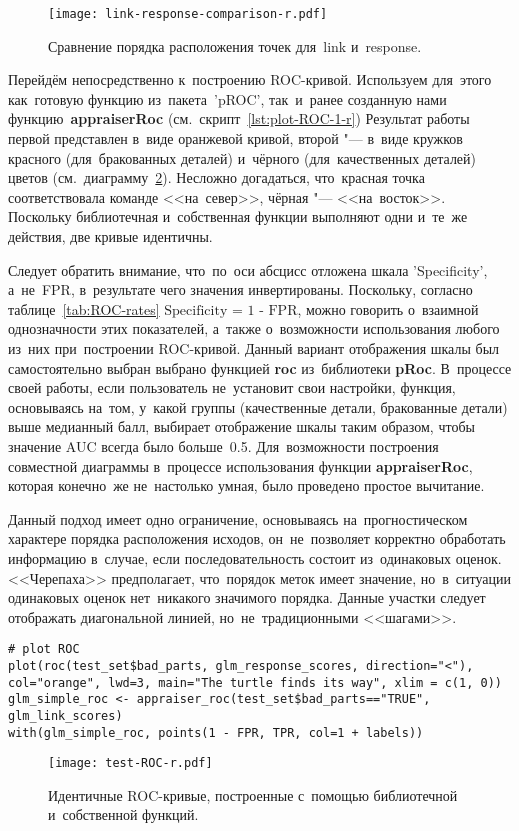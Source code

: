 \documentclass[]{scrreprt}
\begin{document}
%
%
\begin{figure}[ht]
	\centering
	\texttt{[image: link-response-comparison-r.pdf]}
	\caption{Сравнение порядка расположения точек для~\foreignlanguage{english}{link} и~\foreignlanguage{english}{response}.}
	\label{fig:link-response-comparison-r}
\end{figure}
%

Перейдём непосредственно к~построению ROC-кривой. Используем для~этого как~готовую функцию из~пакета~'pROC', так~и~ранее созданную нами функцию~\textbf{appraiserRoc} (см.~скрипт~\ref{lst:plot-ROC-1-r}) Результат работы первой представлен в~виде оранжевой кривой, второй "--- в~виде кружков красного (для~бракованных деталей) и~чёрного (для~качественных деталей) цветов (см.~диаграмму~\ref{fig:test-ROC-r}). Несложно догадаться, что~красная точка соответствовала команде <<на~север>>, чёрная "--- <<на~восток>>. Поскольку библиотечная и~собственная функции выполняют одни и~те~же действия, две кривые идентичны.

Следует обратить внимание, что~по~оси абсцисс отложена шкала \foreignlanguage{english}{'Specificity'}, а~не~FPR, в~результате чего значения инвертированы. Поскольку, согласно таблице~\ref{tab:ROC-rates} $\text{Specificity = 1 - FPR}$, можно говорить о~взаимной однозначности этих показателей, а~также о~возможности использования любого из~них при~построении ROC-кривой. Данный вариант отображения шкалы был самостоятельно выбран выбрано функцией \textbf{roc} из~библиотеки \textbf{pRoc}. В~процессе своей работы, если пользователь не~установит свои настройки, функция, основываясь на~том, у~какой группы (качественные детали, бракованные детали) выше медианный балл, выбирает отображение шкалы таким образом, чтобы значение AUC всегда было больше~0.5. Для~возможности построения совместной диаграммы в~процессе использования функции \textbf{appraiserRoc}, которая конечно~же не~настолько умная, было проведено простое вычитание.

Данный подход имеет одно ограничение, основываясь на~прогностическом характере порядка расположения исходов, он~не~позволяет корректно обработать информацию в~случае, если последовательность состоит из~одинаковых оценок. <<Черепаха>> предполагает, что~порядок меток имеет значение, но~в~ситуации одинаковых оценок нет~никакого значимого порядка. Данные участки следует отображать диагональной линией, но~не~традиционными <<шагами>>.
%
\begin{lstlisting}[float, caption = Построение ROC-кривой с~помощью библиотечной и~собственной функций, firstnumber=1, label= lst:plot-ROC-1-r]
# plot ROC
plot(roc(test_set$bad_parts, glm_response_scores, direction="<"),
col="orange", lwd=3, main="The turtle finds its way", xlim = c(1, 0))
glm_simple_roc <- appraiser_roc(test_set$bad_parts=="TRUE", glm_link_scores)
with(glm_simple_roc, points(1 - FPR, TPR, col=1 + labels))
\end{lstlisting}
%
\begin{figure}[ht]
	\centering
	\texttt{[image: test-ROC-r.pdf]}
	\caption{Идентичные ROC-кривые, построенные с~помощью библиотечной и~собственной функций.}
	\label{fig:test-ROC-r}
\end{figure}
%
\end{document}
